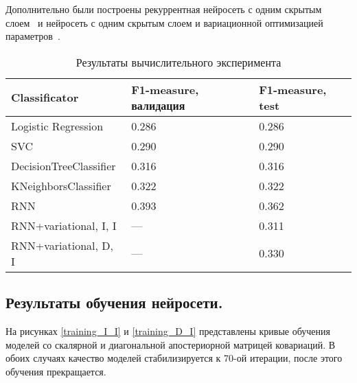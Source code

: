 \documentclass[12pt, fleqn, unicode]{article}
\begin{document}
Дополнительно были построены рекуррентная нейросеть с одним скрытым слоем~\cite{Sanborn} и нейросеть с одним скрытым слоем и вариационной оптимизацией параметров~\cite{Graves, code}.

\begin{table}[!htp]
	\centering
	\caption{Результаты вычислительного эксперимента}
	\label{my-label}
	\begin{tabular}{|l|l|l|}
		\hline
		Classificator          & F1-measure, валидация & F1-measure, test \\ \hline
		Logistic Regression    & 0.286                 & 0.286            \\ \hline
		SVC                    & 0.290                 & 0.290            \\ \hline
		DecisionTreeClassifier & 0.316                 & 0.316            \\ \hline
		KNeighborsClassifier   & 0.322                 & 0.322            \\ \hline
		RNN                    & 0.393                 & 0.362            \\ \hline
		RNN+variational, I, I  &  ---                     & 0.311            \\ \hline
		RNN+variational, D, I  &  ---                     & 0.330             \\ \hline
	\end{tabular}
\end{table}

\subsection{Результаты обучения нейросети.}
На рисунках \ref{training_I_I} и \ref{training_D_I} представлены кривые обучения моделей со скалярной и диагональной апостериорной матрицей ковариаций. В обоих случаях качество моделей стабилизируется к 70-ой итерации, после этого обучения прекращается.
\end{document}

